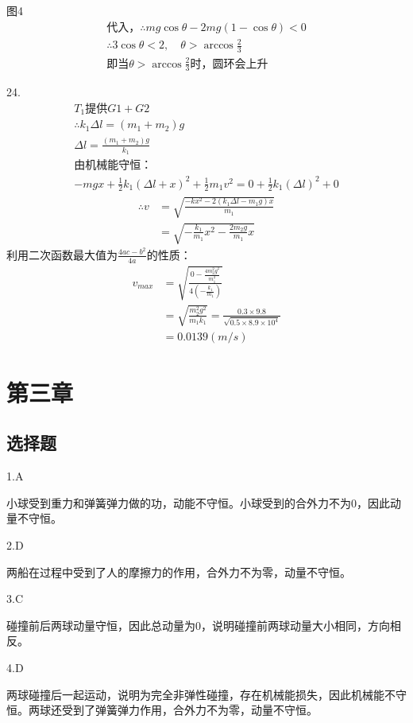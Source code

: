 \documentclass[blue, pad]{./templete/qyxfnote}
\begin{document}
	图4
	\begin{gather*}
	\text{代入，}\therefore mg\cos\theta-2mg(1-\cos\theta)<0\\
	\therefore 3\cos\theta<2,\quad \theta>\arccos\frac{2}{3}\\
	\text{即当}\theta>\arccos\frac{2}{3}\text{时，圆环会上升}
	\end{gather*}
	\raggedright
	24.
	\begin{gather*}
	T_1\text{提供}G1+G2\\
	\therefore k_1\Delta l=(m_1+m_2)g\\
	\Delta l=\frac{(m_1+m_2)g}{k_1}\\
	\text{由机械能守恒：}\\
	-mgx+\frac{1}{2}k_1(\Delta l+x)^2+\frac{1}{2}m_1v^2=0+\frac{1}{2}k_1(\Delta l)^2+0
	\end{gather*}
	\begin{align*}
	\therefore v&=\sqrt{\frac{-kx^2-2(k_1\Delta l-m_1g)x}{m_1}}\\
	&=\sqrt{-\frac{k_1}{m_1}x^2-\frac{2m_2g}{m_1}x}
	\end{align*}
	利用二次函数最大值为$\frac{4ac-b^2}{4a}$的性质：
	\begin{align*}
	v_{max}	&=\sqrt{\frac{0-\frac{4m_2^2g^2}{m_1^2}}{4\left(-\frac{k_1}{m_1}\right)}}\\
	&=\sqrt{\frac{m_2^2g^2}{m_1k_1}}=\frac{0.3\times 9.8}{\sqrt{0.5\times 8.9\times 10^4}}\\
	&=0.0139(m/s)
	\end{align*}


	
	\section{第三章}
		\subsection{选择题}
			1.A
			
			小球受到重力和弹簧弹力做的功，动能不守恒。小球受到的合外力不为0，因此动量不守恒。
			
			2.D
			
			两船在过程中受到了人的摩擦力的作用，合外力不为零，动量不守恒。
			
			3.C
			
			碰撞前后两球动量守恒，因此总动量为0，说明碰撞前两球动量大小相同，方向相反。
			
			4.D
			
			两球碰撞后一起运动，说明为完全非弹性碰撞，存在机械能损失，因此机械能不守恒。两球还受到了弹簧弹力作用，合外力不为零，动量不守恒。
			
\end{document}
